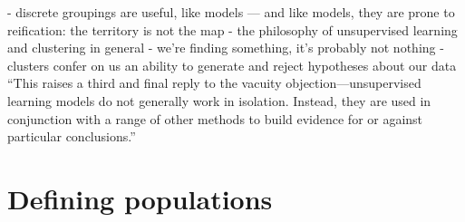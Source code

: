 - discrete groupings are useful, like models --- and like models, they are prone to reification: the territory is not the map
- the philosophy of unsupervised learning and clustering in general
- we're finding something, it's probably not nothing
- clusters confer on us an ability to generate and reject hypotheses about our data ``This raises a third and final reply to the vacuity objection—unsupervised learning models do not generally work in isolation. Instead, they are used in conjunction with a range of other methods to build evidence for or against particular conclusions.''

\clearpage

\section{Defining populations}

